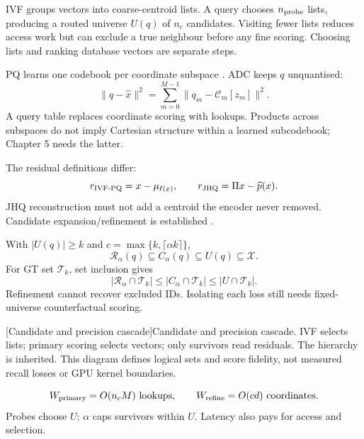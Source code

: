 IVF groups vectors into coarse-centroid lists. A query chooses $n_{\rm probe}$ lists,
producing a routed universe $U(q)$ of $n_c$ candidates. Visiting fewer lists
reduces access work but can exclude a true neighbour before any fine scoring.
Choosing lists and ranking database vectors are separate steps.

PQ learns one codebook per coordinate subspace \cite{pq}. ADC keeps $q$ unquantised:
\begin{equation}
 \|q-\widehat x\|^2=\sum_{m=0}^{M-1}\|q_m-\mathcal C_m[z_m]\|^2.
 \label{eq:2-adc}
\end{equation}
A query table replaces coordinate scoring with lookups. Products across subspaces do not imply Cartesian structure within a learned subcodebook; Chapter 5 needs the latter.

The residual definitions differ:
\[
 r_{\rm IVF\text{-}PQ}=x-\mu_{\ell(x)},\qquad
 r_{\rm JHQ}=\Pi x-\widehat p(x).
\]
JHQ reconstruction must not add a centroid the encoder never removed. Candidate expansion/refinement is established \cite{johnson_gpu,faiss_refine}.

With $|U(q)|\geq k$ and $c=\max\{k,\lceil\alpha k\rceil\}$,
\begin{equation}
 \mathcal R_\alpha(q)\subseteq C_\alpha(q)\subseteq U(q)\subseteq\mathcal X.
 \label{eq:2-cascade}
\end{equation}
For GT set $\mathcal T_k$, set inclusion gives
\[
 |\mathcal R_\alpha\cap\mathcal T_k|
 \leq |C_\alpha\cap\mathcal T_k|
 \leq |U\cap\mathcal T_k|.
\]
Refinement cannot recover excluded IDs. Isolating each loss still needs fixed-universe counterfactual scoring.

\par\medskip\noindent\begin{minipage}{\linewidth}
\centering\captionsetup{hypcap=false}
\resizebox{\linewidth}{!}{}
[Candidate and precision cascade]{Candidate and precision cascade. IVF selects lists;
primary scoring selects vectors; only survivors read residuals. The hierarchy
is inherited. This diagram defines logical sets and score fidelity,
not measured recall losses or GPU kernel boundaries.}
\label{fig:2-cascade}
\end{minipage}\par\medskip

\[
 W_{\rm primary}=O(n_cM)\ \text{lookups},\qquad
 W_{\rm refine}=O(cd)\ \text{coordinates}.
\]
Probes choose $U$; $\alpha$ caps survivors within $U$. Latency also pays for access and selection.
